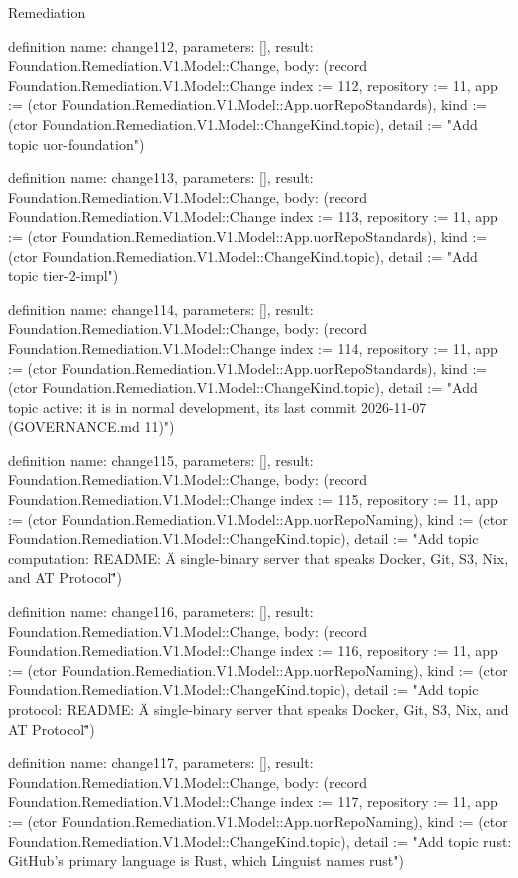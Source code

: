 \begin{lexlean}{Remediation}
\begin{semanticmodule}
definition{
  name: change112,
  parameters: [],
  result: Foundation.Remediation.V1.Model::Change,
  body: (record Foundation.Remediation.V1.Model::Change {index := 112, repository := 11, app := (ctor Foundation.Remediation.V1.Model::App.uorRepoStandards), kind := (ctor Foundation.Remediation.V1.Model::ChangeKind.topic), detail := "Add topic uor-foundation"})
}

definition{
  name: change113,
  parameters: [],
  result: Foundation.Remediation.V1.Model::Change,
  body: (record Foundation.Remediation.V1.Model::Change {index := 113, repository := 11, app := (ctor Foundation.Remediation.V1.Model::App.uorRepoStandards), kind := (ctor Foundation.Remediation.V1.Model::ChangeKind.topic), detail := "Add topic tier-2-impl"})
}

definition{
  name: change114,
  parameters: [],
  result: Foundation.Remediation.V1.Model::Change,
  body: (record Foundation.Remediation.V1.Model::Change {index := 114, repository := 11, app := (ctor Foundation.Remediation.V1.Model::App.uorRepoStandards), kind := (ctor Foundation.Remediation.V1.Model::ChangeKind.topic), detail := "Add topic active: it is in normal development, its last commit 2026-11-07 (GOVERNANCE.md 11)"})
}

definition{
  name: change115,
  parameters: [],
  result: Foundation.Remediation.V1.Model::Change,
  body: (record Foundation.Remediation.V1.Model::Change {index := 115, repository := 11, app := (ctor Foundation.Remediation.V1.Model::App.uorRepoNaming), kind := (ctor Foundation.Remediation.V1.Model::ChangeKind.topic), detail := "Add topic computation: README: \"A single-binary server that speaks Docker, Git, S3, Nix, and AT Protocol\""})
}

definition{
  name: change116,
  parameters: [],
  result: Foundation.Remediation.V1.Model::Change,
  body: (record Foundation.Remediation.V1.Model::Change {index := 116, repository := 11, app := (ctor Foundation.Remediation.V1.Model::App.uorRepoNaming), kind := (ctor Foundation.Remediation.V1.Model::ChangeKind.topic), detail := "Add topic protocol: README: \"A single-binary server that speaks Docker, Git, S3, Nix, and AT Protocol\""})
}

definition{
  name: change117,
  parameters: [],
  result: Foundation.Remediation.V1.Model::Change,
  body: (record Foundation.Remediation.V1.Model::Change {index := 117, repository := 11, app := (ctor Foundation.Remediation.V1.Model::App.uorRepoNaming), kind := (ctor Foundation.Remediation.V1.Model::ChangeKind.topic), detail := "Add topic rust: GitHub's primary language is Rust, which Linguist names rust"})
}


\end{semanticmodule}
\end{lexlean}
